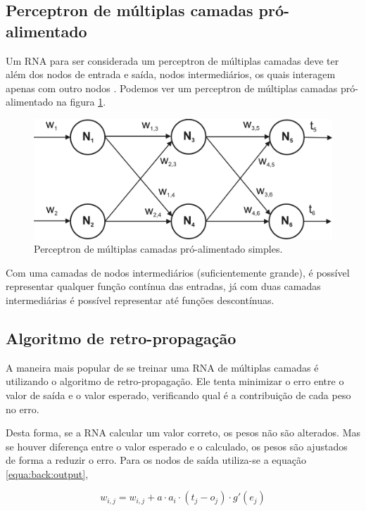 \subsection{Perceptron de múltiplas camadas pró-alimentado}

Um RNA para ser considerada um perceptron de múltiplas camadas deve ter além dos nodos de entrada e saída, nodos intermediários, os quais interagem apenas com outro nodos \cite{sandhya}. Podemos ver um perceptron de múltiplas camadas pró-alimentado na figura \ref{fig:rna}.

\begin{figure}[ht]
 \begin{center}
  \includegraphics[width=5.8in]{imagens/rna.png}
 \end{center}
 \caption{Perceptron de múltiplas camadas pró-alimentado simples.}
 \label{fig:rna}
\end{figure}

Com uma camadas de nodos intermediários (suficientemente grande), é possível representar qualquer função contínua das entradas, já com duas camadas intermediárias é possível representar até funções descontínuas.

\subsection{Algoritmo de retro-propagação}

A maneira mais popular de se treinar uma RNA de múltiplas camadas é utilizando o algoritmo de retro-propagação. Ele tenta minimizar o erro entre o valor de saída e o valor esperado, verificando qual é a contribuição de cada peso no erro.

Desta forma, se a RNA calcular um valor correto, os pesos não são alterados. Mas se houver diferença entre o valor esperado e o calculado, os pesos são ajustados de forma a reduzir o erro. Para os nodos de saída utiliza-se a equação \ref{equa:back:output},

\begin{equation}
	w_{i,j} = w_{i,j} + a \cdot a_i \cdot (t_j - o_j) \cdot g'(e_j)
	\label{equa:back:output}
\end{equation}

